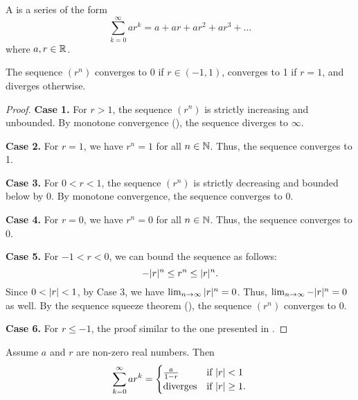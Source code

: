 \begin{definition}
  A  is a series of the form
  \[ \sum_{k = 0}^{\infty} ar^k = a + ar + ar^2 + ar^3 + \dots \]
  where $a, r \in \mathbb R$.
\end{definition}

\begin{lemma}
  The sequence $(r^n)$ converges to 0 if $r \in (-1, 1)$, converges
  to 1 if $r = 1$, and diverges otherwise.
\end{lemma}

\begin{proof}
  \phantom{.}

  \textbf{Case 1.} For $r > 1$, the sequence $(r^n)$ is strictly
  increasing and unbounded. By monotone convergence
  (), the sequence diverges to $\infty$.

  \textbf{Case 2.} For $r = 1$, we have $r^n = 1$ for all $n \in
  \mathbb N$. Thus, the sequence converges to 1.

  \textbf{Case 3.} For $0 < r < 1$, the sequence $(r^n)$ is strictly
  decreasing and bounded below by 0. By monotone convergence, the
  sequence converges to 0.

  \textbf{Case 4.} For $r = 0$, we have $r^n = 0$ for all $n \in
  \mathbb N$. Thus, the sequence converges to 0.

  \textbf{Case 5.} For $-1 < r < 0$, we can bound the sequence as follows:
  \[ -| r |^n \leq r^n \leq | r |^n. \]
  Since $0 < | r | < 1$, by Case 3, we have $\lim_{n \to
  \infty} | r |^n = 0$. Thus, $\lim_{n \to \infty} -| r |^n =
  0$ as well. By the sequence squeeze theorem
  (), the sequence $(r^n)$ converges to 0.

  \textbf{Case 6.} For $r \leq -1$, the proof similar to the one
  presented in .
\end{proof}

\begin{proposition}
  Assume $a$ and $r$ are non-zero real numbers. Then
  \begin{align*}
    \sum_{k = 0}^{\infty} ar^k =
    \begin{cases}
      \frac{a}{1 - r} & \text{if $| r | < 1$} \\
      \text{diverges} & \text{if $| r | \geq 1$}.
    \end{cases}
  \end{align*}
\end{proposition}

